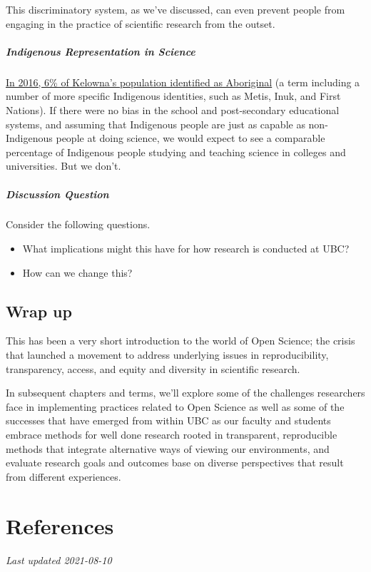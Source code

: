 \documentclass[
]{book}
\providecommand{\tightlist}{%
  \setlength{\itemsep}{0pt}\setlength{\parskip}{0pt}}
\begin{document}
This discriminatory system, as we've discussed, can even prevent people from engaging in the practice of scientific research from the outset.

\hypertarget{indigenous-representation-in-science}{%
\paragraph*{Indigenous Representation in Science}\label{indigenous-representation-in-science}}

\href{https://www12.statcan.gc.ca/census-recensement/2016/as-sa/fogs-spg/Facts-cma-eng.cfm?LANG=Eng\&GK=CMA\&GC=915\&TOPIC=9}{In 2016, 6\% of Kelowna's population identified as Aboriginal} (a term including a number of more specific Indigenous identities, such as Metis, Inuk, and First Nations). If there were no bias in the school and post-secondary educational systems, and assuming that Indigenous people are just as capable as non-Indigenous people at doing science, we would expect to see a comparable percentage of Indigenous people studying and teaching science in colleges and universities. But we don't.

\hypertarget{discussion-question}{%
\paragraph*{Discussion Question}\label{discussion-question}}

Consider the following questions.

\begin{itemize}
\tightlist
\item
  What implications might this have for how research is conducted at UBC?
\item
  How can we change this?
\end{itemize}

\hypertarget{wrap-up}{%
\section{Wrap up}\label{wrap-up}}

This has been a very short introduction to the world of Open Science; the crisis that launched a movement to address underlying issues in reproducibility, transparency, access, and equity and diversity in scientific research.

In subsequent chapters and terms, we'll explore some of the challenges researchers face in implementing practices related to Open Science as well as some of the successes that have emerged from within UBC as our faculty and students embrace methods for well done research rooted in transparent, reproducible methods that integrate alternative ways of viewing our environments, and evaluate research goals and outcomes base on diverse perspectives that result from different experiences.

\hypertarget{references}{%
\chapter{References}\label{references}}

\emph{Last updated 2021-08-10}

  
\end{document}
